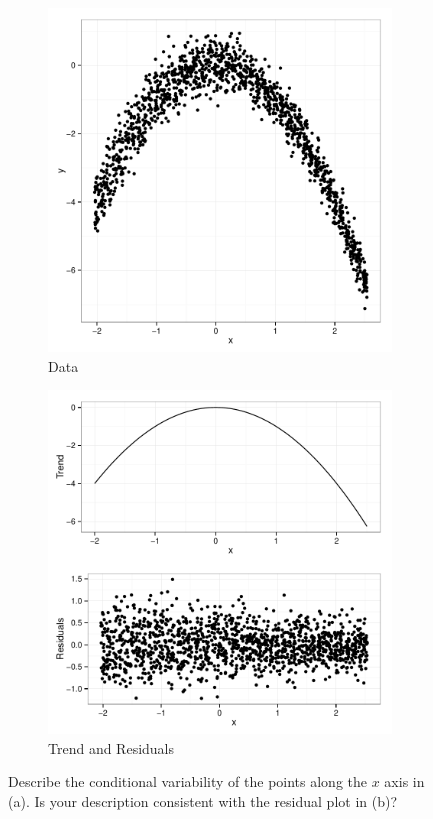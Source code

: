 \documentclass[11pt]{isuthesis}\usepackage[]{graphicx}\usepackage[]{color}
\begin{document}
\begin{figure} \hfill
\begin{subfigure}[b]{.45\linewidth}
  \centering
  \includegraphics[width=\linewidth]{fig-cleveland1}
  \caption{\small Data}
  \label{fig:clevelandsubfig1}
\end{subfigure} \hfill\hfill
\begin{subfigure}[b]{.45\linewidth}
  \centering
  \includegraphics[width=\linewidth]{fig-cleveland2}
  \caption{\small Trend and Residuals}
  \label{fig:clevelandsubfig2}
\end{subfigure} \hfill
\caption[Changing variability and nonlinear trend lines]{Describe the conditional variability of the points along the $x$ axis in (a). Is your description consistent with the residual plot in (b)?}
\label{fig:cleveland-figure}
\end{figure}
\end{document}
